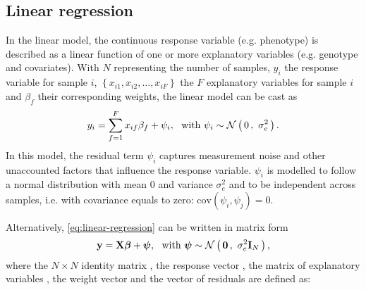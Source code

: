 \subsection{Linear regression}
In the linear model, the continuous response variable (e.g. phenotype) is described as a linear function of one or more explanatory variables (e.g. genotype and covariates). With \(N\) representing the number of samples, \(y_i\) the response variable for sample \(i\), \(\left\{x_{i1}, x_{i2}, \dots, x_{iF}\right\}\)  the \(F\) explanatory variables for sample \(i\) and \(\beta_{f}\) their corresponding weights, the linear model can be cast as
\begin{equation}
y_i = \sum^{F}_{f=1}x_{if}\beta_{f} + \psi_i, \,\,\,\, \text{with }  \psi_i \sim \mathcal{N}\left(\,{0}\,,~{\sigma^2_e}\,\right).
\label{eq:linear-regression}
\end{equation}
%
In this model, the residual term \(\psi_i\) captures measurement noise and other unaccounted factors that influence the response variable. \(\psi_i\) is modelled to follow a normal distribution with mean 0 and variance \(\sigma^2_e\) and to be independent across 
samples, i.e. with covariance equals to zero: \(\text{cov}\left(\psi_i,\psi_j\right)=0\).

Alternatively, \cref{eq:linear-regression} can be written in matrix form
\begin{equation}
\boldsymbol{\mathbf{y}} = \boldsymbol{\mathbf{X}}\boldsymbol{\mathbf{\beta}} + \boldsymbol{\mathbf{\psi}}, \,\,\,\, \text{with }  \boldsymbol{\mathbf{\psi}} \sim  \mathcal{N}\left(\,{\boldsymbol{\mathbf{0}}}\,,~{\sigma^2_e\boldsymbol{\mathbf{I}}_{N}}\,\right),
\label{eq:linear-regression-matrix}
\end{equation}
%
where the \(N \times N\) identity matrix , the response vector , the matrix of explanatory variables , the weight vector \tmat{\beta} and the vector of residuals \tmat{\psi} are defined as:


